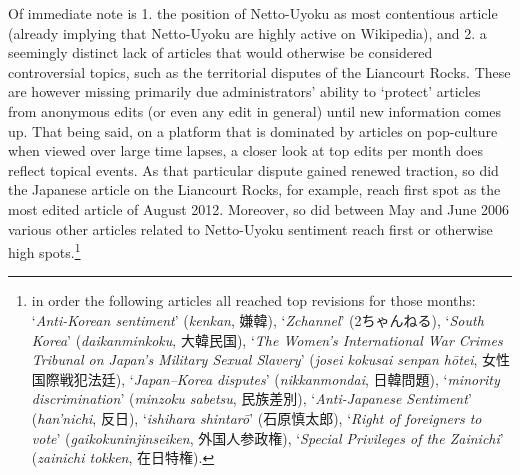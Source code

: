 \documentclass[10pt,british,A4paper,,openany]{memoir}
\begin{document}
Of immediate note is 1. the position of Netto-Uyoku as  most
contentious article (already implying that Netto-Uyoku are highly active
on Wikipedia), and 2. a seemingly distinct lack of articles that would
otherwise be considered controversial topics, such as the territorial
disputes of the Liancourt Rocks. These are however missing primarily due
administrators' ability to `protect' articles from anonymous edits (or
even any edit in general) until new information comes up. That being
said, on a platform that is dominated by articles on pop-culture when
viewed over large time lapses, a closer look at top edits per month does
reflect topical events. As that particular dispute gained renewed
traction, so did the Japanese article on the Liancourt Rocks, for
example, reach first spot as the most edited article of August 2012.
Moreover, so did between May and June 2006 various other articles
related to Netto-Uyoku sentiment reach first or otherwise high
spots.\footnote{in order the following articles all reached top
  revisions for those months: `\emph{Anti-Korean sentiment}'
  (\emph{kenkan}, 嫌韓), `\emph{Zchannel}' (2ちゃんねる), `\emph{South
  Korea}' (\emph{daikanminkoku}, 大韓民国), `\emph{The Women's
  International War Crimes Tribunal on Japan's Military Sexual Slavery}'
  (\emph{josei kokusai senpan hōtei}, 女性国際戦犯法廷),
  `\emph{Japan--Korea disputes}' (\emph{nikkanmondai}, 日韓問題),
  `\emph{minority discrimination}' (\emph{minzoku sabetsu}, 民族差別),
  `\emph{Anti-Japanese Sentiment}' (\emph{han'nichi}, 反日),
  `\emph{ishihara shintarō}' (石原慎太郎), `\emph{Right of foreigners to
  vote}' (\emph{gaikokuninjinseiken}, 外国人参政権), `\emph{Special
  Privileges of the Zainichi}' (\emph{zainichi tokken}, 在日特権).}
\end{document}

